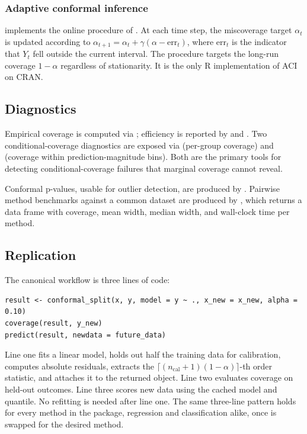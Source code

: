 \subsubsection{Adaptive conformal
inference}\label{adaptive-conformal-inference}

 implements the online procedure of
\citet{gibbs2021adaptive}. At each time step, the miscoverage target
\(\alpha_t\) is updated according to
\(\alpha_{t+1} = \alpha_t + \gamma(\alpha - \mathrm{err}_t)\), where
\(\mathrm{err}_t\) is the indicator that \(Y_t\) fell outside the
current interval. The procedure targets the long-run coverage
\(1-\alpha\) regardless of stationarity. It is the only R implementation
of ACI on CRAN.

\subsection{Diagnostics}\label{diagnostics}

Empirical coverage is computed via ; efficiency is
reported by  and . Two
conditional-coverage diagnostics are exposed via
 (per-group coverage) and
 (coverage within prediction-magnitude bins).
Both are the primary tools for detecting conditional-coverage failures
that marginal coverage cannot reveal.

Conformal p-values, usable for outlier detection, are produced by
. Pairwise method benchmarks against a common
dataset are produced by , which returns a
data frame with coverage, mean width, median width, and wall-clock time
per method.

\subsection{Replication}\label{replication}

The canonical workflow is three lines of code:

\begin{verbatim}
result <- conformal_split(x, y, model = y ~ ., x_new = x_new, alpha = 0.10)
coverage(result, y_new)
predict(result, newdata = future_data)
\end{verbatim}

Line one fits a linear model, holds out half the training data for
calibration, computes absolute residuals, extracts the
\(\lceil(n_{\text{cal}}+1)(1-\alpha)\rceil\)-th order statistic, and
attaches it to the returned object. Line two evaluates coverage on
held-out outcomes. Line three scores new data using the cached model and
quantile. No refitting is needed after line one. The same three-line
pattern holds for every method in the package, regression and
classification alike, once  is swapped for the
desired method.

